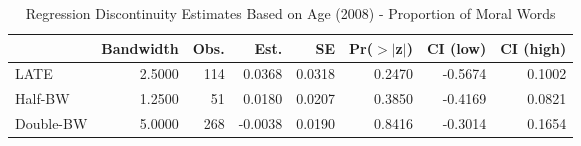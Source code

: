 \begin{table}[ht]
\centering
\begin{tabular}{lrrrrrrr}
  \hline
 & Bandwidth & Obs. & Est. & SE & Pr($>$$|$z$|$) & CI (low) & CI (high) \\ 
  \hline
LATE & 2.5000 & 114 & 0.0368 & 0.0318 & 0.2470 & -0.5674 & 0.1002 \\ 
  Half-BW & 1.2500 & 51 & 0.0180 & 0.0207 & 0.3850 & -0.4169 & 0.0821 \\ 
  Double-BW & 5.0000 & 268 & -0.0038 & 0.0190 & 0.8416 & -0.3014 & 0.1654 \\ 
   \hline
\end{tabular}
\caption{Regression Discontinuity Estimates Based on Age (2008) - Proportion of Moral Words} 
\label{tab:Xrd2008y}
\end{table}
